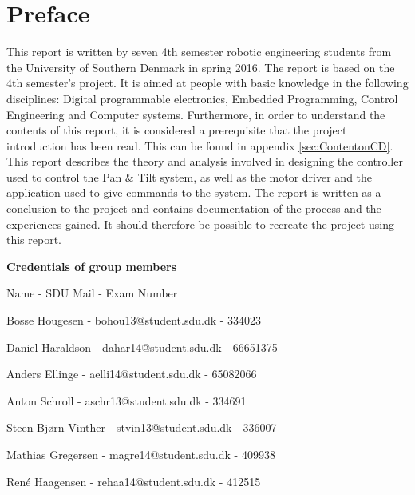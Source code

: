 \section*{Preface}

This report is written by seven 4th semester robotic engineering students from the University of Southern Denmark in spring 2016. The report is based on the 4th semester's project.
It is aimed at people with basic knowledge in the following disciplines: Digital programmable electronics, Embedded Programming, Control Engineering and Computer systems. Furthermore, in order to understand the contents of this report, it is considered a prerequisite that the project introduction has been read. This can be found in appendix \ref{sec:ContentonCD}.
This report describes the theory and analysis involved in designing the controller used to control the Pan \& Tilt system, as well as the motor driver and the application used to give commands to the system.
The report is written as a conclusion to the project and contains documentation of the process and the experiences gained. It should therefore be possible to recreate the project using this report.


\textbf{Credentials of group members}

Name 				- SDU Mail					- Exam Number

Bosse Hougesen  	- bohou13@student.sdu.dk	- 334023

Daniel Haraldson	- dahar14@student.sdu.dk	- 66651375

Anders Ellinge		- aelli14@student.sdu.dk	- 65082066

Anton Schroll		- aschr13@student.sdu.dk	- 334691

Steen-Bjørn Vinther - stvin13@student.sdu.dk	- 336007

Mathias Gregersen	- magre14@student.sdu.dk	- 409938

René Haagensen		- rehaa14@student.sdu.dk	- 412515